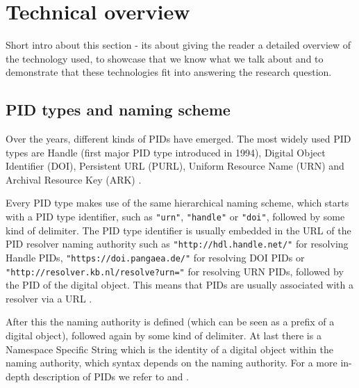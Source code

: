 \section{Technical overview}\label{tech-oview}
Short intro about this section - its about giving the reader a detailed overview of the technology used, to showcase that we know what we talk about and to demonstrate that these technologies fit into answering the research question.

\subsection{PID types and naming scheme}\label{pid-types}
Over the years, different kinds of PIDs have emerged. The most widely used PID types are Handle (first major PID type introduced 
in 1994), Digital Object Identifier (DOI), Persistent URL (PURL), Uniform Resource Name (URN) and 
Archival Resource Key (ARK) \cite{pid-oview, odin, hdl}.

Every PID type makes use of the same hierarchical naming scheme, which starts with a PID type identifier,
 such as \texttt{"urn"}, \texttt{"handle"} or \texttt{"doi"}, followed by some kind of delimiter. The PID type identifier is usually embedded in the URL of the PID resolver naming authority 
such as \texttt{"http://hdl.handle.net/"} for resolving Handle PIDs, \texttt{"https://doi.pangaea.de/"} for resolving DOI PIDs or \texttt{"http://resolver.kb.nl/resolve?urn="} for resolving URN PIDs, followed by the PID of the digital object. This means that PIDs are usually associated with a resolver via a URL \cite{ids, icn-bd}.

After this the naming authority is defined (which can be seen as a prefix of a digital object), followed again 
by some kind of delimiter. At last there is a Namespace Specific String which is the identity of a digital object within the naming authority, which syntax depends on the naming
authority.
For a more in-depth description of PIDs we refer to \cite{icn-bd} and \cite{pid-oview}.

